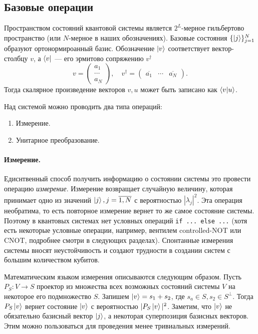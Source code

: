 \documentclass{article}
\theoremstyle{definition}
\begin{document}
\subsection{Базовые операции}

Пространством состояний квантовой системы является $2^L$-мерное гильбертово пространство
(или $N$-мерное в наших обозначениях).
Базовые состояния $\{\ket{j}\}_{j=1}^N$ образуют ортонормироанный базис.
Обозначение $\ket{v}$ соответствует вектор-столбцу $v$, а $\bra{v}$ --- его эрмитово сопряжению $v^\dag$
\[
    v = \begin{pmatrix}
    a_1 \\
    \cdots \\
    a_N 
    \end{pmatrix},
    \quad
    v^\dag = \begin{pmatrix} \overline{a_1} & \cdots & \overline{a_N} \end{pmatrix}.
\]
Тогда скалярное произведение векторов $v, u$ может быть записано как $\bra{v}\ket{u}$.

Над системой можно проводить два типа операций:
\begin{enumerate}
    \item Измерение.
    \item Унитарное преобразование.
\end{enumerate}

\paragraph*{Измерение.}
Едиснтвенный способ получить информацию о состоянии системы это провести операцию {\em измерение}.
Измерение возвращает случайную величину, которая принимает одно из значений $\ket{j}, j=\overline{1, N}$
с вероятностью $|\lambda_j|^2$.
Эта операция необратима, то есть повторное измерение вернет то же самое состояние системы.
Поэтому в квантовых системах нет условных операций \texttt{if ... else ...} (хотя есть некоторые условные операции, например, вентилем controlled-NOT или CNOT, подробнее смотри в следующих разделах).
Спонтанные измерения системы вносят неустойчивость и создают трудности в создании систем с большим количеством кубитов.

Математическим языком измерения описываются следующим образом.
Пусть $P_S \colon V \rightarrow S$ проектор из множества всех возможных состояний системы $V$
на некоторое его подмножество $S$.
Запишем $\ket{v} = s_1 + s_2$, где $s_a \in S, s_2 \in S^\bot$.
Тогда $P_S\ket{v}$ вернет состояние $\ket{v}$ с вероятностью $|P_S\ket{v}|^2$.
Заметим, что $\ket{v}$ не обязательно базисный вектор $\ket{j}$, а некоторая суперпозиция базисных векторов.
Этим можно пользоваться для проведения менее тривиальных измерений.
\end{document}
